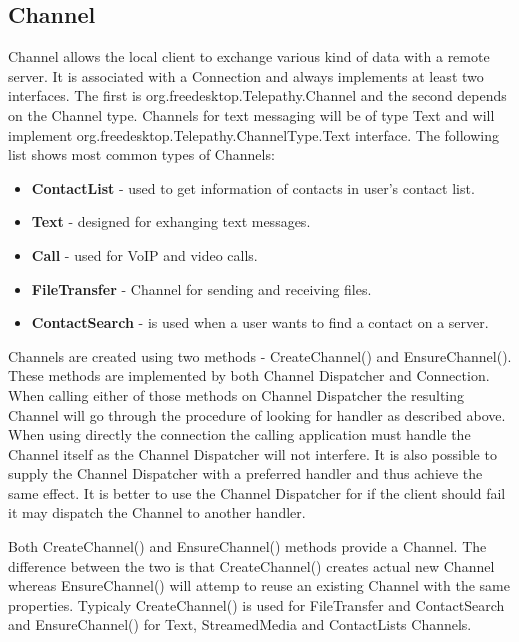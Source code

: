 \subsection*{Channel}
Channel allows the local client to exchange various kind of data with a remote server. It is associated with a Connection and always implements at least two interfaces. The first is org.freedesktop.Telepathy.Channel and the second depends on the Channel type. Channels for text messaging will be of type Text and will implement org.freedesktop.Telepathy.ChannelType.Text interface. The following list shows most common types of Channels\cite{TPWiki}:

\begin{itemize}

	\item {\bf ContactList} - used to get information of contacts in user's contact list.

	\item {\bf Text} - designed for exhanging text messages. 

	\item {\bf Call} - used for VoIP and video calls. 

	\item {\bf FileTransfer} - Channel for sending and receiving files.

	\item {\bf ContactSearch} - is used when a user wants to find a contact on a server.

\end{itemize}

Channels are created using two methods - CreateChannel() and EnsureChannel(). These methods are implemented by both Channel Dispatcher and Connection. When calling either of those methods on Channel Dispatcher the resulting Channel will go through the procedure of looking for handler as described above. When using directly the connection the calling application must handle the Channel itself as the Channel Dispatcher will not interfere. It is also possible to supply the Channel Dispatcher with a preferred handler and thus achieve the same effect. It is better to use the Channel Dispatcher for if the client should fail it may dispatch the Channel to another handler.\cite{TPWiki}

Both CreateChannel() and EnsureChannel() methods provide a Channel. The difference between the two is that CreateChannel() creates actual new Channel whereas EnsureChannel() will attemp to reuse an existing Channel with the same properties. Typicaly CreateChannel() is used for FileTransfer and ContactSearch and EnsureChannel() for Text, StreamedMedia and ContactLists Channels.\cite{TPWiki} 

